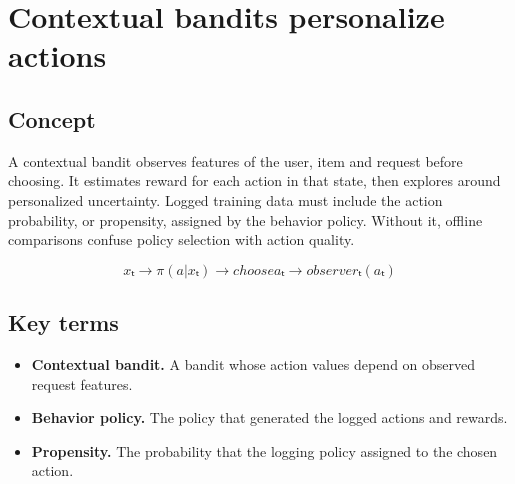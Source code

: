 \section{Contextual bandits personalize actions}

\begin{abstract}
The best action depends on the user and moment, not only on a global arm average.
\end{abstract}

\subsection{Concept}
A contextual bandit observes features of the user, item and request before choosing. It estimates reward for each action in that state, then explores around personalized uncertainty. Logged training data must include the action probability, or propensity, assigned by the behavior policy. Without it, offline comparisons confuse policy selection with action quality.

\begin{equation*}
xₜ \rightarrow π(a | xₜ) \rightarrow choose aₜ \rightarrow observe rₜ(aₜ)
\end{equation*}

\subsection{Key terms}
\begin{itemize}
\item \textbf{Contextual bandit.} A bandit whose action values depend on observed request features.
\item \textbf{Behavior policy.} The policy that generated the logged actions and rewards.
\item \textbf{Propensity.} The probability that the logging policy assigned to the chosen action.
\end{itemize}
